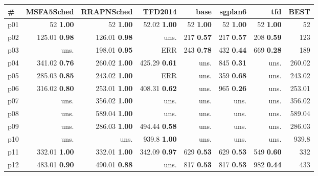 \begin{tabular}{|l|rrrrrr|r|}
\hline
\textbf{\#} & \textbf{MSFA5Sched} & \textbf{RRAPNSched} & \textbf{TFD2014} & \textbf{base} & \textbf{sgplan6} & \textbf{tfd} & \textbf{BEST}\\
\hline
p01 & {\footnotesize 52} \textbf{1.00} & {\footnotesize 52} \textbf{1.00} & {\footnotesize 52.02} \textbf{1.00} & {\footnotesize 52} \textbf{1.00} & {\footnotesize 52} \textbf{1.00} & {\footnotesize 52} \textbf{1.00} & 52\\
p02 & {\footnotesize 125.01} \textbf{0.98} & {\footnotesize 126.01} \textbf{0.98} & uns. & {\footnotesize 217} \textbf{0.57} & {\footnotesize 217} \textbf{0.57} & {\footnotesize 208} \textbf{0.59} & 123\\
p03 & uns. & {\footnotesize 198.01} \textbf{0.95} & ERR & {\footnotesize 243} \textbf{0.78} & {\footnotesize 432} \textbf{0.44} & {\footnotesize 669} \textbf{0.28} & 189\\
p04 & {\footnotesize 341.02} \textbf{0.76} & {\footnotesize 260.02} \textbf{1.00} & {\footnotesize 425.29} \textbf{0.61} & uns. & {\footnotesize 845} \textbf{0.31} & uns. & 260.02\\
p05 & {\footnotesize 285.03} \textbf{0.85} & {\footnotesize 243.02} \textbf{1.00} & ERR & uns. & {\footnotesize 359} \textbf{0.68} & uns. & 243.02\\
p06 & {\footnotesize 316.02} \textbf{0.80} & {\footnotesize 253.01} \textbf{1.00} & {\footnotesize 408.31} \textbf{0.62} & uns. & {\footnotesize 965} \textbf{0.26} & uns. & 253.01\\
p07 & uns. & {\footnotesize 356.02} \textbf{1.00} & uns. & uns. & uns. & uns. & 356.02\\
p08 & uns. & {\footnotesize 589.04} \textbf{1.00} & uns. & uns. & uns. & uns. & 589.04\\
p09 & uns. & {\footnotesize 286.03} \textbf{1.00} & {\footnotesize 494.44} \textbf{0.58} & uns. & uns. & uns. & 286.03\\
p10 & uns. & uns. & {\footnotesize 939.8} \textbf{1.00} & uns. & uns. & uns. & 939.8\\
p11 & {\footnotesize 332.01} \textbf{1.00} & {\footnotesize 332.01} \textbf{1.00} & {\footnotesize 342.09} \textbf{0.97} & {\footnotesize 629} \textbf{0.53} & {\footnotesize 629} \textbf{0.53} & {\footnotesize 549} \textbf{0.60} & 332\\
p12 & {\footnotesize 483.01} \textbf{0.90} & {\footnotesize 490.01} \textbf{0.88} & uns. & {\footnotesize 817} \textbf{0.53} & {\footnotesize 817} \textbf{0.53} & {\footnotesize 982} \textbf{0.44} & 433\\

\end{tabular}
